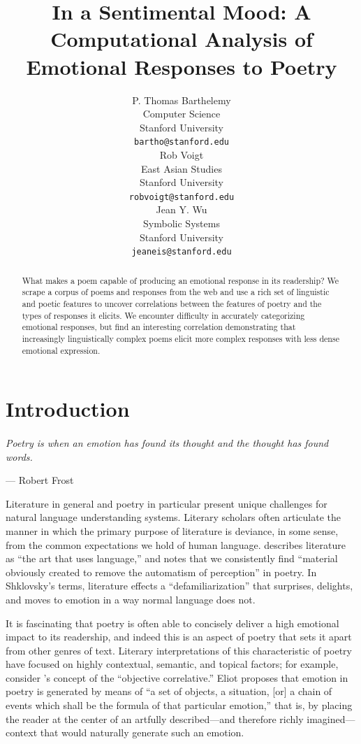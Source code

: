 \documentclass[11pt]{article}
\title{In a Sentimental Mood: A Computational Analysis of Emotional Responses to Poetry}
\author{P. Thomas Barthelemy \\
  Computer Science\\
  Stanford University \\
  {\tt bartho@stanford.edu} \\\And
  Rob Voigt \\
  East Asian Studies \\
  Stanford University \\
  {\tt robvoigt@stanford.edu} \\\And
  Jean Y. Wu \\
  Symbolic Systems  \\
  Stanford University\\
  {\tt jeaneis@stanford.edu} \\}
\date{}
\begin{document}
\maketitle
\begin{abstract}
What makes a poem capable of producing an emotional response in its readership? We scrape a corpus of poems and responses from the web and use a rich set of linguistic and poetic features to uncover correlations between the features of poetry and the types of responses it elicits. We encounter difficulty in accurately categorizing emotional responses, but find an interesting correlation demonstrating that increasingly linguistically complex poems elicit more complex responses with less dense emotional expression.
\end{abstract}

\section{Introduction}

\paragraph{}
\emph{Poetry is when an emotion has found its thought and the thought has found words.}
\begin{flushright}
--- Robert Frost\\
\end{flushright}


Literature in general and poetry in particular present unique challenges for natural language understanding systems. Literary scholars often articulate the manner in which the primary purpose of literature is deviance, in some sense, from the common expectations we hold of human language.  describes literature as ``the art that uses language,'' and  notes that we consistently find ``material obviously created to remove the automatism of perception'' in poetry. In Shklovsky's terms, literature effects a ``defamiliarization'' that surprises, delights, and moves to emotion in a way normal language does not.

It is fascinating that poetry is often able to concisely deliver a high emotional impact to its readership, and indeed this is an aspect of poetry that sets it apart from other genres of text. Literary interpretations of this characteristic of poetry have focused on highly contextual, semantic, and topical factors; for example, consider 's concept of the ``objective correlative.'' Eliot proposes that emotion in poetry is generated by means of ``a set of objects, a situation, [or] a chain of events which shall be the formula of that particular emotion,'' that is, by placing the reader at the center of an artfully described---and therefore richly imagined---context that would naturally generate such an emotion.
\end{document}
